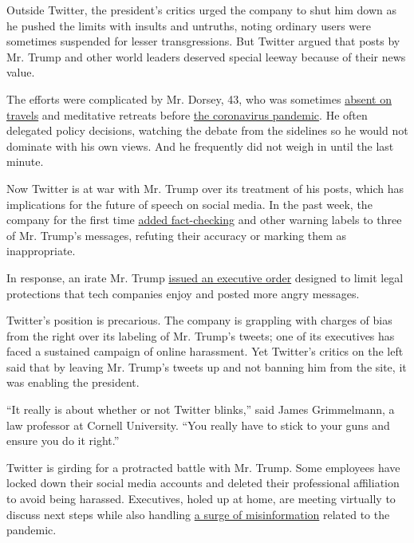 Outside Twitter, the president's critics urged the company to shut him
down as he pushed the limits with insults and untruths, noting ordinary
users were sometimes suspended for lesser transgressions. But Twitter
argued that posts by Mr. Trump and other world leaders deserved special
leeway because of their news value.

The efforts were complicated by Mr. Dorsey, 43, who was sometimes
\href{https://www.nytimes.com/2020/02/29/business/dealbook/elliott-twitter-jack-dorsey.html}{absent
on travels} and meditative retreats before
\href{https://www.nytimes.com/news-event/coronavirus?action=click\&pgtype=Article\&state=default\&module=styln-coronavirus-national\&variant=show\&region=TOP_BANNER\&context=storylines_menu}{the
coronavirus pandemic}. He often delegated policy decisions, watching the
debate from the sidelines so he would not dominate with his own views.
And he frequently did not weigh in until the last minute.

Now Twitter is at war with Mr. Trump over its treatment of his posts,
which has implications for the future of speech on social media. In the
past week, the company for the first time
\href{https://www.nytimes.com/2020/05/26/technology/twitter-trump-mail-in-ballots.html}{added
fact-checking} and other warning labels to three of Mr. Trump's
messages, refuting their accuracy or marking them as inappropriate.

In response, an irate Mr. Trump
\href{https://www.nytimes.com/2020/05/28/us/politics/trump-jack-dorsey.html}{issued
an executive order} designed to limit legal protections that tech
companies enjoy and posted more angry messages.

Twitter's position is precarious. The company is grappling with charges
of bias from the right over its labeling of Mr. Trump's tweets; one of
its executives has faced a sustained campaign of online harassment. Yet
Twitter's critics on the left said that by leaving Mr. Trump's tweets up
and not banning him from the site, it was enabling the president.

``It really is about whether or not Twitter blinks,'' said James
Grimmelmann, a law professor at Cornell University. ``You really have to
stick to your guns and ensure you do it right.''

Twitter is girding for a protracted battle with Mr. Trump. Some
employees have locked down their social media accounts and deleted their
professional affiliation to avoid being harassed. Executives, holed up
at home, are meeting virtually to discuss next steps while also handling
\href{https://www.nytimes.com/2020/03/08/technology/coronavirus-misinformation-social-media.html}{a
surge of misinformation} related to the pandemic.

